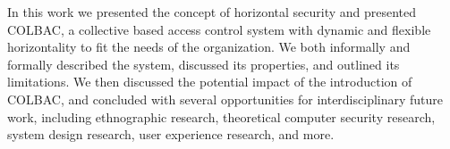 In this work we presented the concept of horizontal security and presented
COLBAC, a collective based access control system with dynamic and flexible
horizontality to fit the needs of the organization. We both informally and
formally described the system, discussed its properties, and outlined its
limitations. We then discussed the potential impact of the introduction of
COLBAC, and concluded with several opportunities for interdisciplinary future
work, including ethnographic research, theoretical computer security research,
system design research, user experience research, and more.


